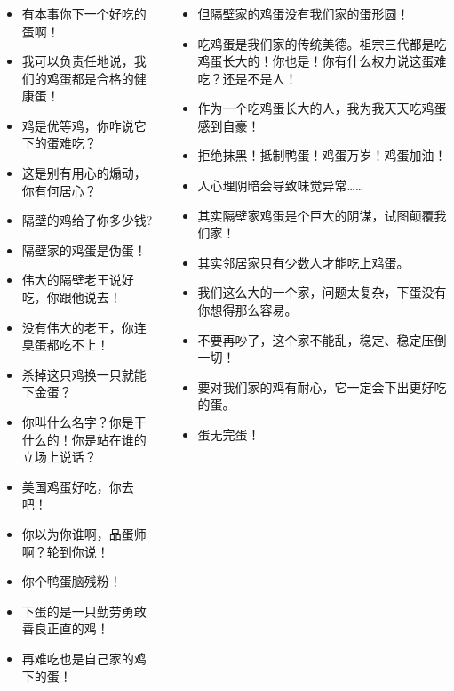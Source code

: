 \documentclass[UTF8,11pt,colorlinks,compress,openany]{beamer}%
\begin{document}
\begin{frame}\frametitle{}
\centering{\large\textcolor{red}{“这鸡蛋真难吃。”}}\footnotesize
\begin{columns}[onlytextwidth]
\begin{itemize}
	\item 有本事你下一个好吃的蛋啊！
	\item 我可以负责任地说，我们的鸡蛋都是合格的健康蛋！
	\item 鸡是优等鸡，你咋说它下的蛋难吃？
	\item 这是别有用心的煽动，你有何居心？
	\item 隔壁的鸡给了你多少钱?
	\item 隔壁家的鸡蛋是伪蛋！
	\item 伟大的隔壁老王说好吃，你跟他说去！
	\item 没有伟大的老王，你连臭蛋都吃不上！
	\item 杀掉这只鸡换一只就能下金蛋？
	\item 你叫什么名字？你是干什么的！你是站在谁的立场上说话？
	\item 美国鸡蛋好吃，你去吧！
	\item 你以为你谁啊，品蛋师啊？轮到你说！
	\item 你个鸭蛋脑残粉！
	\item 下蛋的是一只勤劳勇敢善良正直的鸡！
	\item 再难吃也是自己家的鸡下的蛋！
\end{itemize}
\begin{itemize}
	\item 但隔壁家的鸡蛋没有我们家的蛋形圆！
	\item 吃鸡蛋是我们家的传统美德。祖宗三代都是吃鸡蛋长大的！你也是！你有什么权力说这蛋难吃？还是不是人！
	\item 作为一个吃鸡蛋长大的人，我为我天天吃鸡蛋感到自豪！
	\item 拒绝抹黑！抵制鸭蛋！鸡蛋万岁！鸡蛋加油！
	\item 人心理阴暗会导致味觉异常……
	\item 其实隔壁家鸡蛋是个巨大的阴谋，试图颠覆我们家！
	\item 其实邻居家只有少数人才能吃上鸡蛋。
	\item 我们这么大的一个家，问题太复杂，下蛋没有你想得那么容易。
	\item 不要再吵了，这个家不能乱，稳定、稳定压倒一切！
	\item 要对我们家的鸡有耐心，它一定会下出更好吃的蛋。
	\item 蛋无完蛋！
\end{itemize}
\end{columns}
\end{frame}
\end{document}
